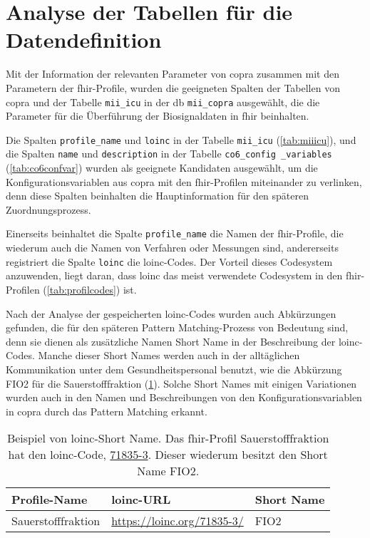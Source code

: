 \section{Analyse der Tabellen für die Datendefinition} \label{sec:analysiscolums}

Mit der Information der relevanten Parameter von \ac{copra} zusammen mit den Parametern der \ac{fhir}-Profile, wurden die geeigneten Spalten der Tabellen von \ac{copra} und der Tabelle \texttt{mii\_icu} in der \ac{db} \texttt{mii\_copra} ausgewählt, die die Parameter für die Überführung der Biosignaldaten in \ac{fhir} beinhalten.

Die Spalten \texttt{profile\_name} und \texttt{loinc} in der Tabelle \texttt{mii\_icu} (\ref{tab:miiicu}), und die Spalten \texttt{name} und \texttt{description} in der Tabelle \texttt{co6\_config \_variables} (\ref{tab:co6confvar}) wurden als geeignete Kandidaten ausgewählt, um die Konfigurationsvariablen aus \ac{copra} mit den \ac{fhir}-Profilen miteinander zu verlinken, denn diese Spalten beinhalten die Hauptinformation für den späteren Zuordnungsprozess.
 
 Einerseits beinhaltet die Spalte \texttt{profile\_name} die Namen der \ac{fhir}-Profile, die wiederum auch die Namen von Verfahren oder Messungen sind, andererseits registriert die Spalte \texttt{loinc} die \ac{loinc}-Codes. Der Vorteil dieses Codesystem anzuwenden, liegt daran, dass \ac{loinc} das meist verwendete Codesystem in den \ac{fhir}-Profilen (\ref{tab:profilcodes}) ist. 
 
 Nach der Analyse der gespeicherten \ac{loinc}-Codes wurden auch Abkürzungen gefunden, die für den späteren Pattern Matching-Prozess von Bedeutung sind, denn sie dienen als zusätzliche Namen \glqq Short Name\grqq{} in der Beschreibung der \ac{loinc}-Codes. Manche dieser \glqq Short Names\grqq{} werden auch in der alltäglichen Kommunikation unter dem Gesundheitspersonal benutzt, wie die Abkürzung FIO2 für die Sauerstofffraktion (\ref{tab:shortname}). Solche \glqq Short Names\grqq{} mit einigen Variationen wurden auch in den Namen und Beschreibungen von den Konfigurationsvariablen in \ac{copra} durch das Pattern Matching erkannt.

\begin{table}[ht]
	\centering 
	\caption[Beispiel von \acs{loinc}-\glqq Short Name\grqq{}]{Beispiel von \acs{loinc}-\glqq Short Name\grqq{}. Das \ac{fhir}-Profil \glqq Sauerstofffraktion\grqq{} hat den \ac{loinc}-Code, \href{https://loinc.org/71835-3/}{71835-3}. Dieser wiederum besitzt den \glqq Short Name\grqq{} FIO2.}
	\label{tab:shortname}
	\begin{tabular}{|p{4cm}|l|l|}
		\hline
		\bfseries Profile-Name & \bfseries \ac{loinc}-URL & \bfseries Short Name \\ \hline
		Sauerstofffraktion & \url{https://loinc.org/71835-3/} & 
		FIO2 \\ \hline 
	\end{tabular}
\end{table}

